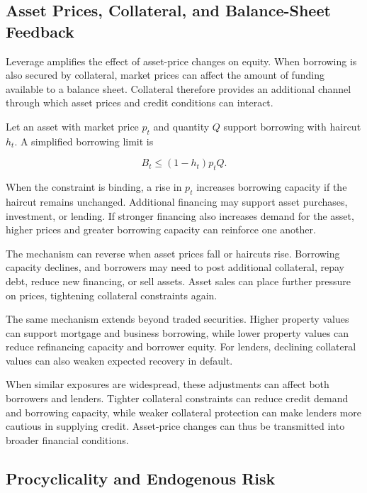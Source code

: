 \subsection{Asset Prices, Collateral, and Balance-Sheet Feedback}

Leverage amplifies the effect of asset-price changes on equity. When borrowing is also secured by collateral, market prices can affect the amount of funding available to a balance sheet. Collateral therefore provides an additional channel through which asset prices and credit conditions can interact.

Let an asset with market price \(p_t\) and quantity \(Q\) support borrowing with haircut \(h_t\). A simplified borrowing limit is

\begin{equation}
B_t
\leq
(1-h_t)p_tQ.
\label{eq:ch21-collateral-borrowing-limit}
\end{equation}

When the constraint is binding, a rise in \(p_t\) increases borrowing capacity if the haircut remains unchanged. Additional financing may support asset purchases, investment, or lending. If stronger financing also increases demand for the asset, higher prices and greater borrowing capacity can reinforce one another.

The mechanism can reverse when asset prices fall or haircuts rise. Borrowing capacity declines, and borrowers may need to post additional collateral, repay debt, reduce new financing, or sell assets. Asset sales can place further pressure on prices, tightening collateral constraints again.

The same mechanism extends beyond traded securities. Higher property values can support mortgage and business borrowing, while lower property values can reduce refinancing capacity and borrower equity. For lenders, declining collateral values can also weaken expected recovery in default.

When similar exposures are widespread, these adjustments can affect both borrowers and lenders. Tighter collateral constraints can reduce credit demand and borrowing capacity, while weaker collateral protection can make lenders more cautious in supplying credit. Asset-price changes can thus be transmitted into broader financial conditions.


\subsection{Procyclicality and Endogenous Risk}


